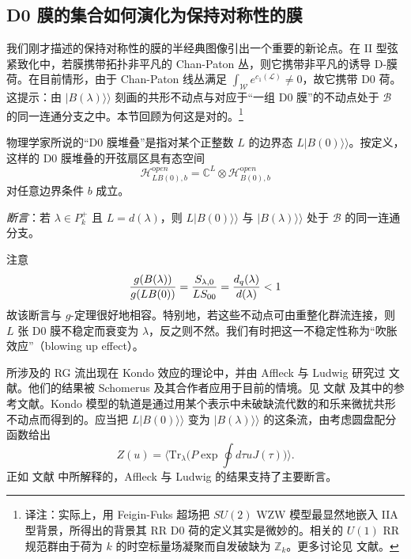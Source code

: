 \documentclass[11pt,a4paper]{ctexart}
\newcommand{\TN}[1]{\footnote{译注：#1}}
\begin{document}
\subsection{D0 膜的集合如何演化为保持对称性的膜}\label{d0-ux819cux7684ux96c6ux5408ux5982ux4f55ux6f14ux5316ux4e3aux4fddux6301ux5bf9ux79f0ux6027ux7684ux819c}

我们刚才描述的保持对称性的膜的半经典图像引出一个重要的新论点。在 II 型弦紧致化中，若膜携带拓扑非平凡的 Chan-Paton 丛，则它携带非平凡的诱导 D-膜荷。在目前情形，由于 Chan-Paton 线丛满足 \(\int_{{\mathcal W}} e^{c_1({\mathcal L})}\not=0\)，故它携带 D0 荷。这提示：由 \(\vert B(\lambda) \rangle\rangle\) 刻画的共形不动点与对应于``一组 D0 膜''的不动点处于 \({\mathcal B}\) 的同一连通分支之中。本节回顾为何这是对的。\TN{实际上，用 Feigin-Fuks 超场把 \(SU(2)\) WZW 模型最显然地嵌入 IIA 型背景，所得出的背景其 RR D0 荷的定义其实是微妙的。相关的 \(U(1)\) RR 规范群由于荷为 \(k\) 的时空标量场凝聚而自发破缺为 \(\mathbb{Z}_k\)。更多讨论见 文献。}

物理学家所说的``D0 膜堆叠''是指对某个正整数 \(L\) 的边界态 \(L \vert B(0)\rangle\rangle\)。按定义，这样的 D0 膜堆叠的开弦扇区具有态空间 \[{\mathcal H}_{L B(0) , b }^{\mathrm open} = \mathbb{C}^L \otimes {\mathcal H}_{B(0),b}^{\mathrm open}\] 对任意边界条件 \(b\) 成立。

\emph{断言}：若 \(\lambda\in P_k^+\) 且 \(L=d(\lambda)\)，则 \(L \vert B(0)\rangle\rangle\) 与 \(\vert B(\lambda)\rangle\rangle\) 处于 \({\mathcal B}\) 的同一连通分支。

注意 \[\frac{g(B(\lambda))}{g(LB(0) )} = {S_{\lambda,0}\over L S_{00}} = \frac{d_q(\lambda)}{d(\lambda)} < 1\] 故该断言与 \(g\)-定理很好地相容。特别地，若这些不动点可由重整化群流连接，则 \(L\) 张 D0 膜不稳定而衰变为 \(\lambda\)，反之则不然。我们有时把这一不稳定性称为``吹胀效应''（blowing up effect）。

所涉及的 RG 流出现在 Kondo 效应的理论中，并由 Affleck 与 Ludwig 研究过 文献。他们的结果被 Schomerus 及其合作者应用于目前的情境。见 文献 及其中的参考文献。Kondo 模型的轨道是通过用某个表示中未破缺流代数的和乐来微扰共形不动点而得到的。应当把 \(L \vert B(0)\rangle\rangle\) 变为 \(\vert B(\lambda)\rangle\rangle\) 的这条流，由考虑圆盘配分函数给出 \[Z(u) = \langle {\mathrm{Tr}}_{\lambda}\biggl( P \exp \oint d\tau u J(\tau) \biggr)\rangle.\] 正如 文献 中所解释的，Affleck 与 Ludwig 的结果支持了主要断言。
\end{document}
